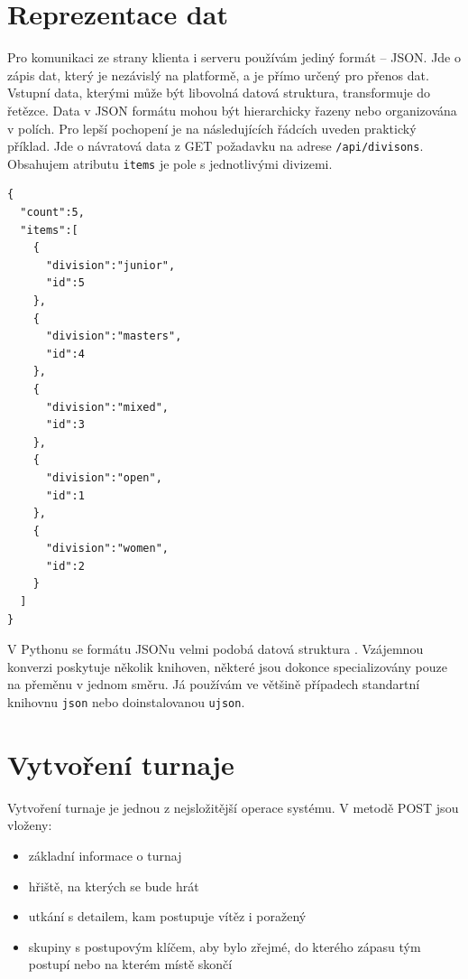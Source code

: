 \section{Reprezentace dat}

Pro komunikaci ze strany klienta i serveru používám jediný formát -- JSON.
Jde o zápis dat, který je nezávislý na platformě, a je přímo určený pro přenos dat.
Vstupní data, kterými může být libovolná datová struktura, transformuje do řetězce.
Data v JSON formátu mohou být hierarchicky řazeny nebo organizována v polích.
Pro lepší pochopení je na následujících řádcích uveden praktický příklad.
Jde o návratová data z GET požadavku na adrese \texttt{/api/divisons}.
Obsahujem atributu \texttt{items} je pole s jednotlivými divizemi.

\begingroup
\fontsize{9.5pt}{11pt}\selectfont
\begin{lstlisting}[basicstyle=\small,style=json]
 {
  "count":5,
  "items":[
    {
      "division":"junior",
      "id":5
    },
    {
      "division":"masters",
      "id":4
    },
    {
      "division":"mixed",
      "id":3
    },
    {
      "division":"open",
      "id":1
    },
    {
      "division":"women",
      "id":2
    }
  ]
}
\end{lstlisting}
\endgroup

V Pythonu se formátu JSONu velmi podobá datová struktura \cite{python_dict}.
Vzájemnou konverzi poskytuje několik knihoven, některé jsou dokonce specializovány pouze na přeměnu v jednom směru.
Já používám ve většině případech standartní knihovnu \texttt{json}\cite{python_json}
nebo doinstalovanou \texttt{ujson}\cite{python_ujson}.

\section{Vytvoření turnaje}

Vytvoření turnaje je jednou z nejsložitější operace systému. V metodě POST jsou vloženy:

\begin{itemize}
 \item základní informace o turnaj
 \item hřiště, na kterých se bude hrát
 \item utkání s detailem, kam postupuje vítěz i poražený
 \item skupiny s postupovým klíčem, aby bylo zřejmé, do kterého zápasu tým postupí nebo na kterém místě skončí
\end{itemize}

